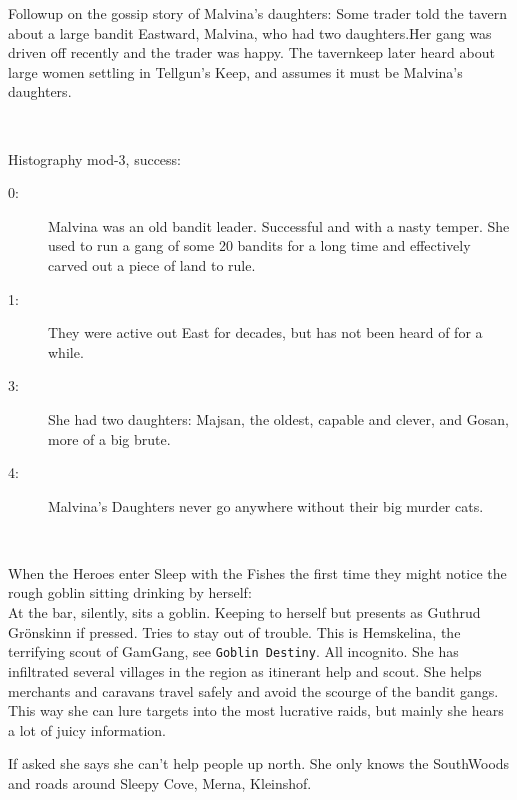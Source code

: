 Followup on the gossip story of Malvina's daughters: Some trader told the tavern about a large bandit Eastward, Malvina, who had two daughters.Her gang was driven off recently and the trader was happy. The tavernkeep later heard about large women settling in Tellgun's Keep, and assumes it must be Malvina's daughters.

\

\noindent
Histography mod-3, success:
\begin{description}
   \item[0:] Malvina was an old bandit leader. Successful and with a nasty temper. She used to run a gang of some 20 bandits for a long time and effectively carved out a piece of land to rule.
   \item[1:] They were active out East for decades, but has not been heard of for a while.
   \item[3:] She had two daughters: Majsan, the oldest, capable and clever, and Gosan, more of a big brute.
   \item[4:] Malvina's Daughters never go anywhere without their big murder cats.
\end{description}

\

When the Heroes enter Sleep with the Fishes the first time they might notice the rough goblin sitting drinking by herself: \\
At the bar, silently, sits a goblin. Keeping to herself but presents as Guthrud Grönskinn if pressed. Tries to stay out of trouble. This is Hemskelina, the terrifying scout of GamGang, see \texttt{Goblin Destiny}. All incognito. She has infiltrated several villages in the region as itinerant help and scout. She helps merchants and caravans travel safely and avoid the scourge of the bandit gangs. This way she can lure targets into the most lucrative raids, but mainly she hears a lot of juicy information.

If asked she says she can't help people up north. She only knows the SouthWoods and roads around Sleepy Cove, Merna, Kleinshof.









